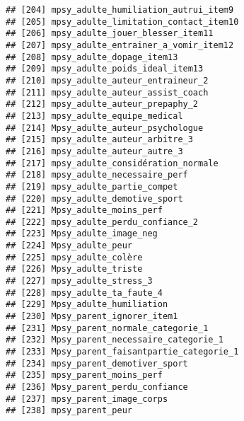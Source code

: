 \documentclass[
]{article}
\begin{document}
\begin{verbatim}
## [204] mpsy_adulte_humiliation_autrui_item9                             
## [205] mpsy_adulte_limitation_contact_item10                            
## [206] mpsy_adulte_jouer_blesser_item11                                 
## [207] mpsy_adulte_entrainer_a_vomir_item12                             
## [208] mpsy_adulte_dopage_item13                                        
## [209] mpsy_adulte_poids_ideal_item13                                   
## [210] mpsy_adulte_auteur_entraineur_2                                  
## [211] mpsy_adulte_auteur_assist_coach                                  
## [212] mpsy_adulte_auteur_prepaphy_2                                    
## [213] mpsy_adulte_equipe_medical                                       
## [214] Mpsy_adulte_auteur_psychologue                                   
## [215] mpsy_adulte_auteur_arbitre_3                                     
## [216] mpsy_adulte_auteur_autre_3                                       
## [217] mpsy_adulte_considération_normale                                
## [218] mpsy_adulte_necessaire_perf                                      
## [219] mpsy_adulte_partie_compet                                        
## [220] mpsy_adulte_demotive_sport                                       
## [221] Mpsy_adulte_moins_perf                                           
## [222] mpsy_adulte_perdu_confiance_2                                    
## [223] Mpsy_adulte_image_neg                                            
## [224] Mpsy_adulte_peur                                                 
## [225] mpsy_adulte_colère                                               
## [226] Mpsy_adulte_triste                                               
## [227] mpsy_adulte_stress_3                                             
## [228] mpsy_adulte_ta_faute_4                                           
## [229] Mpsy_adulte_humiliation                                          
## [230] Mpsy_parent_ignorer_item1                                        
## [231] Mpsy_parent_normale_categorie_1                                  
## [232] Mpsy_parent_necessaire_categorie_1                               
## [233] Mpsy_parent_faisantpartie_categorie_1                            
## [234] mpsy_parent_demotiver_sport                                      
## [235] mpsy_parent_moins_perf                                           
## [236] Mpsy_parent_perdu_confiance                                      
## [237] mpsy_parent_image_corps                                          
## [238] mpsy_parent_peur                                                 

\end{verbatim}
\end{document}
